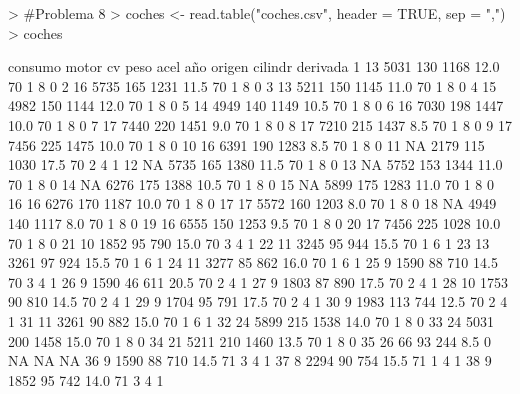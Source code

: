 \documentclass{article}
\begin{document}
\begin{Schunk}
\begin{Sinput}
> #Problema 8
> coches <- read.table("coches.csv", header = TRUE, sep = ",")
> coches
\end{Sinput}
\begin{Soutput}
    consumo motor  cv peso acel año origen cilindr derivada
1        13  5031 130 1168 12.0  70      1       8        0
2        16  5735 165 1231 11.5  70      1       8        0
3        13  5211 150 1145 11.0  70      1       8        0
4        15  4982 150 1144 12.0  70      1       8        0
5        14  4949 140 1149 10.5  70      1       8        0
6        16  7030 198 1447 10.0  70      1       8        0
7        17  7440 220 1451  9.0  70      1       8        0
8        17  7210 215 1437  8.5  70      1       8        0
9        17  7456 225 1475 10.0  70      1       8        0
10       16  6391 190 1283  8.5  70      1       8        0
11       NA  2179 115 1030 17.5  70      2       4        1
12       NA  5735 165 1380 11.5  70      1       8        0
13       NA  5752 153 1344 11.0  70      1       8        0
14       NA  6276 175 1388 10.5  70      1       8        0
15       NA  5899 175 1283 11.0  70      1       8        0
16       16  6276 170 1187 10.0  70      1       8        0
17       17  5572 160 1203  8.0  70      1       8        0
18       NA  4949 140 1117  8.0  70      1       8        0
19       16  6555 150 1253  9.5  70      1       8        0
20       17  7456 225 1028 10.0  70      1       8        0
21       10  1852  95  790 15.0  70      3       4        1
22       11  3245  95  944 15.5  70      1       6        1
23       13  3261  97  924 15.5  70      1       6        1
24       11  3277  85  862 16.0  70      1       6        1
25        9  1590  88  710 14.5  70      3       4        1
26        9  1590  46  611 20.5  70      2       4        1
27        9  1803  87  890 17.5  70      2       4        1
28       10  1753  90  810 14.5  70      2       4        1
29        9  1704  95  791 17.5  70      2       4        1
30        9  1983 113  744 12.5  70      2       4        1
31       11  3261  90  882 15.0  70      1       6        1
32       24  5899 215 1538 14.0  70      1       8        0
33       24  5031 200 1458 15.0  70      1       8        0
34       21  5211 210 1460 13.5  70      1       8        0
35       26    66  93  244  8.5   0     NA      NA       NA
36        9  1590  88  710 14.5  71      3       4        1
37        8  2294  90  754 15.5  71      1       4        1
38        9  1852  95  742 14.0  71      3       4        1

\end{Soutput}
\end{Schunk}
\end{document}
